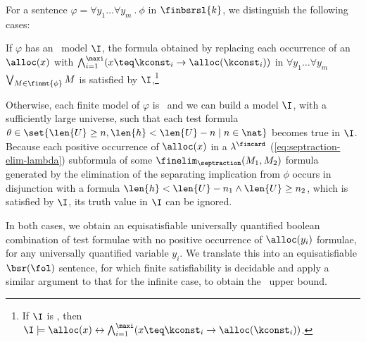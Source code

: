 For a sentence $\varphi = \forall y_1 \ldots \forall y_m ~.~ \phi$ in
$\finbsrsl{k}$, we distinguish the following cases:\begin{compactenum}
\item If $\varphi$ has an \controlled\ model $\I$, the formula
  obtained by replacing each occurrence of an $\alloc(x)$ with
  $\bigwedge_{i=1}^\maxi (x \teq \kconst_i \rightarrow
  \alloc(\kconst_i))$ in $\forall y_1 \ldots \forall y_m$ $\bigvee_{M
    \in \finmt{\phi}} M$ is satisfied by $\I$,\footnote{If $\I$ is
    \controlled, then $\I \models \alloc(x) \leftrightarrow
    \bigwedge_{i=1}^\maxi (x \teq \kconst_i \rightarrow
    \alloc(\kconst_i))$.}
%
\item Otherwise, each finite model of $\varphi$ is \ncontrolled\ and
  we can build a model $\I$, with a sufficiently large universe, such
  that each test formula $\theta \in \set{\len{U} \geq n, \len{h} <
    \len{U} - n \mid n \in \nat}$ becomes true in $\I$. Because each
  positive occurrence of $\alloc(x)$ in a $\lambda^\fincard$
  (\ref{eq:septraction-elim-lambda}) subformula of some
  $\finelim_\septraction(M_1,M_2)$ formula generated by the
  elimination of the separating implication from $\phi$ occurs in
  disjunction with a formula $\len{h} < \len{U}-n_1 \wedge \len{U}\geq
  n_2$, which is satisfied by $\I$, its truth value in $\I$ can be
  ignored.
\end{compactenum}
In both cases, we obtain an equisatisfiable universally quantified
boolean combination of test formulae with no positive occurrence of
$\alloc(y_i)$ formulae, for any universally quantified variable
$y_i$. We translate this into an equisatisfiable $\bsr(\fol)$
sentence, for which finite satisfiability is decidable and apply a
similar argument to that for the infinite case, to obtain
the \pspace\ upper bound.

